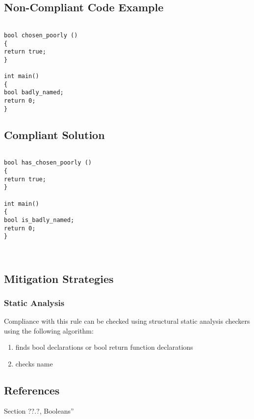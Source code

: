 \subsection{Non-Compliant Code Example}


\begin{verbatim}

bool chosen_poorly ()
{
return true;
}

int main()
{
bool badly_named;
return 0;
}

\end{verbatim}

\subsection{Compliant Solution}


\begin{verbatim}

bool has_chosen_poorly ()
{
return true;
}

int main()
{
bool is_badly_named;
return 0;
}



\end{verbatim}

\subsection{Mitigation Strategies}
\subsubsection{Static Analysis} 

Compliance with this rule can be checked using structural static analysis checkers using the following algorithm:

\begin{enumerate}
\item finds bool declarations or bool return function declarations
\item checks name
\end{enumerate}

\subsection{References}

 Section ??.?, Booleans''

